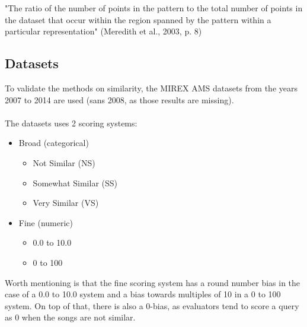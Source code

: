 "The ratio of the number of points in the pattern to the total number of points in the dataset that occur within the region spanned by the pattern
		within a particular representation" (Meredith et al., 2003, p. 8)

\subsection{Datasets}

To validate the methods on similarity, the MIREX AMS datasets from the years 2007 to 2014 are used (sans 2008, as those results are missing).
\\\\
The datasets uses 2 scoring systems:

\begin{itemize}
	\item{Broad (categorical)} 
	\begin{itemize}
		\item{Not Similar (NS)}
		\item{Somewhat Similar (SS)}
		\item{Very Similar (VS)}
	\end{itemize}
	\item{Fine (numeric)}
	\begin{itemize}
		\item{0.0 to 10.0}
		\item{0 to 100}
	\end{itemize}
\end{itemize}
Worth mentioning is that the fine scoring system has a round number bias in the case of a 0.0 to 10.0 system and a bias towards multiples of 10 in a 0 to 100 system. On top of that, there is also a 0-bias, as evaluators tend to score a query as 0 when the songs are not similar.
